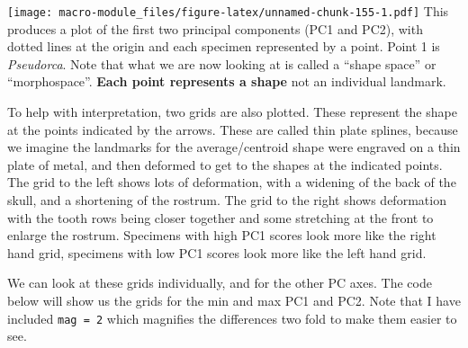 \documentclass[]{book}
\newenvironment{Shaded}{\begin{snugshade}}{\end{snugshade}}
\newcommand{\KeywordTok}[1]{\textcolor[rgb]{0.13,0.29,0.53}{\textbf{{#1}}}}
\newcommand{\DataTypeTok}[1]{\textcolor[rgb]{0.13,0.29,0.53}{{#1}}}
\newcommand{\StringTok}[1]{\textcolor[rgb]{0.31,0.60,0.02}{{#1}}}
\newcommand{\OtherTok}[1]{\textcolor[rgb]{0.56,0.35,0.01}{{#1}}}
\newcommand{\NormalTok}[1]{{#1}}
\begin{document}
\begin{Shaded}
\end{Shaded}

\texttt{[image: macro-module\_files/figure-latex/unnamed-chunk-155-1.pdf]}
This produces a plot of the first two principal components (PC1 and
PC2), with dotted lines at the origin and each specimen represented by a
point. Point 1 is \emph{Pseudorca}. Note that what we are now looking at
is called a ``shape space'' or ``morphospace''. \textbf{Each point
represents a shape} not an individual landmark.

To help with interpretation, two grids are also plotted. These represent
the shape at the points indicated by the arrows. These are called thin
plate splines, because we imagine the landmarks for the average/centroid
shape were engraved on a thin plate of metal, and then deformed to get
to the shapes at the indicated points. The grid to the left shows lots
of deformation, with a widening of the back of the skull, and a
shortening of the rostrum. The grid to the right shows deformation with
the tooth rows being closer together and some stretching at the front to
enlarge the rostrum. Specimens with high PC1 scores look more like the
right hand grid, specimens with low PC1 scores look more like the left
hand grid.

We can look at these grids individually, and for the other PC axes. The
code below will show us the grids for the min and max PC1 and PC2. Note
that I have included \texttt{mag\ =\ 2} which magnifies the differences
two fold to make them easier to see.
\end{document}
